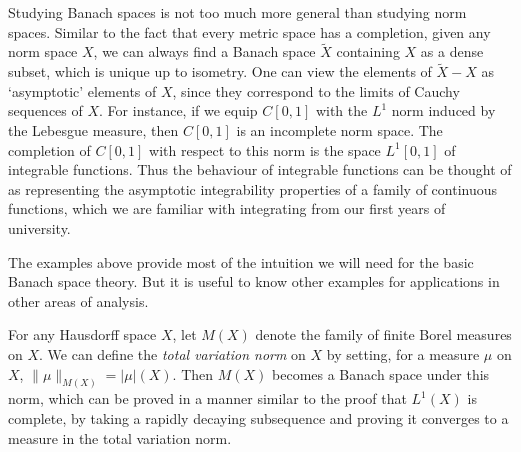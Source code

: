 \begin{remark}
    Studying Banach spaces is not too much more general than studying norm spaces. Similar to the fact that every metric space has a completion, given any norm space $X$, we can always find a Banach space $\tilde{X}$ containing $X$ as a dense subset, which is unique up to isometry. One can view the elements of $\tilde{X} - X$ as `asymptotic' elements of $X$, since they correspond to the limits of Cauchy sequences of $X$. For instance, if we equip $C[0,1]$ with the $L^1$ norm induced by the Lebesgue measure, then $C[0,1]$ is an incomplete norm space. The completion of $C[0,1]$ with respect to this norm is the space $L^1[0,1]$ of integrable functions. Thus the behaviour of integrable functions can be thought of as representing the asymptotic integrability properties of a family of continuous functions, which we are familiar with integrating from our first years of university.
\end{remark}

The examples above provide most of the intuition we will need for the basic Banach space theory. But it is useful to know other examples for applications in other areas of analysis.

\begin{example}
    For any Hausdorff space $X$, let $M(X)$ denote the family of finite Borel measures on $X$. We can define the \emph{total variation norm} on $X$ by setting, for a measure $\mu$ on $X$, $\| \mu \|_{M(X)} = |\mu|(X)$. Then $M(X)$ becomes a Banach space under this norm, which can be proved in a manner similar to the proof that $L^1(X)$ is complete, by taking a rapidly decaying subsequence and proving it converges to a measure in the total variation norm.
\end{example}

